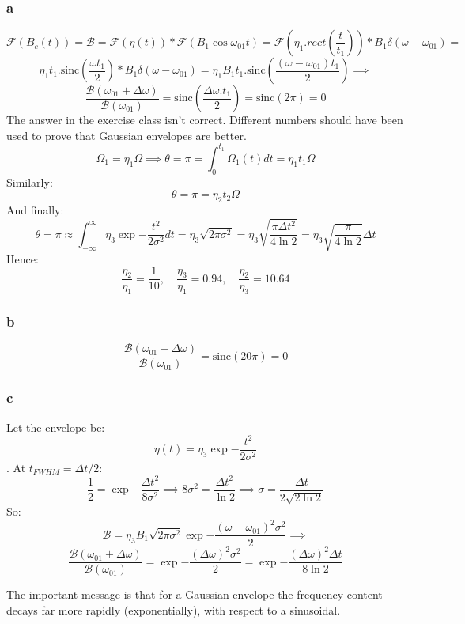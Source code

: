 \documentclass{article}
\begin{document}
\subsubsection{a}
$$\mathcal{F}(B_c(t)) = \mathcal{B} = \mathcal{F}(\eta(t))*\mathcal{F}(B_1\cos{\omega_{01}t}) = \mathcal{F}(\eta_1.rect(\frac{t}{t_1}))*B_1\delta(\omega-\omega_{01}) = $$
$$\eta_1t_1.\text{sinc}(\frac{\omega t_1}{2}) * B_1\delta(\omega-\omega_{01}) = \eta_1B_1t_1.\text{sinc}(\frac{(\omega-\omega_{01})t_1}{2}) \implies  $$
$$\frac{\mathcal{B}(\omega_{01}+\Delta\omega)}{\mathcal{B}(\omega_{01})}=\text{sinc}(\frac{\Delta\omega .t_1}{2}) = \text{sinc}(2\pi) = 0$$
The answer in the exercise class isn't correct. Different numbers should have been used to prove that Gaussian envelopes are better.
$$\Omega_1 = \eta_1\Omega \implies \theta = \pi = \int_0^{t_1}\Omega_1(t)dt = \eta_1t_1\Omega$$
Similarly:
$$\theta = \pi = \eta_2t_2\Omega$$
And finally:
$$\theta = \pi \approx \int_{-\infty}^\infty\eta_3\exp{-\frac{t^2}{2\sigma^2}}dt = \eta_3\sqrt{2\pi\sigma^2} = \eta_3\sqrt{\frac{\pi\Delta t^2}{4\ln{2}}} = \eta_3\sqrt{\frac{\pi}{4\ln{2}}}\Delta t$$
Hence:
$$\frac{\eta_2}{\eta_1} = \frac{1}{10},\quad \frac{\eta_3}{\eta_1}= 0.94, \quad \frac{\eta_2}{\eta_3} = 10.64$$
\subsubsection{b}
$$\frac{\mathcal{B}(\omega_{01}+\Delta\omega)}{\mathcal{B}(\omega_{01})} = \text{sinc}(20\pi) = 0$$
\subsubsection{c}
Let the envelope be:
$$\eta(t) = \eta_3\exp{-\frac{t^2}{2\sigma^2}}$$.
At $t_{FWHM} = \Delta t/2$:
$$\frac{1}{2} = \exp{-\frac{\Delta t^2}{8\sigma^2}} \implies 8\sigma^2 = \frac{\Delta t^2}{\ln{2}} \implies \sigma = \frac{\Delta t}{2\sqrt{2\ln{2}}}$$
So:
$$\mathcal{B} = \eta_3B_1\sqrt{2\pi\sigma^2}\exp{-\frac{(\omega-\omega_{01})^2\sigma^2}{2}} \implies $$
$$\frac{\mathcal{B}(\omega_{01}+\Delta\omega)}{\mathcal{B}(\omega_{01})} = \exp{-\frac{(\Delta\omega)^2 \sigma^2}{2}} = \exp{-\frac{(\Delta\omega)^2 \Delta t}{8\ln{2}}}$$

The important message is that for a Gaussian envelope the frequency content decays far more rapidly (exponentially), with respect to a sinusoidal.
\end{document}
